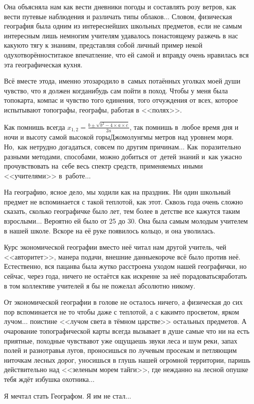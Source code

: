 Она объясняла нам как вести дневники погоды и составлять розу ветров, как вести путевые наблюдения и различать типы облаков$\ldots$ Словом, физическая география была одним из интереснейших школьных предметов, если не самым интересным\mdash 
лишь немногим учителям удавалось по\sdash настоящему разжечь в нас какую\sdash то тягу к знаниям, представляя собой личный пример некой одухотворённости\mdash такое впечатление, что ей самой и вправду очень нравилась вся эта географическая кухня.

Всё вместе это\mdash да, именно это\mdash зародило в~самых потаённых уголках моей души чувство, что я должен когда\sdash нибудь сам пойти в поход. Чтобы у меня была топокарта, компас и чувство того единения, того отчуждения от всех, которое испытывают топографы, географы, работая в <<полях>>.
 
Как помнишь всегда ${x_{1,2}= \frac{b\pm \sqrt{b^2-4\times a\times c}}{2a}}$, так помнишь в~любое время дня и ночи и высоту самой высокой горы\mdash Джомолунгмы метров над уровнем моря. Но,~как нетрудно догадаться, совсем по другим причинам$\ldots$ Как~поразительно разными методами, способами, можно добиться от~детей знаний и~как ужасно прочувствовать на~себе весь спектр средств, применяемых иными <<учителями>> в~работе$\ldots$ 

На географию, ясное дело, мы ходили как на праздник. Ни один школьный предмет не вспоминается с такой теплотой, как этот. Сквозь года очень сложно сказать, сколько географичке было лет, тем более в детстве все кажутся таким взрослыми$\ldots$ Вероятно ей было от 25 до 30. Она была самым молодым учителем в нашей школе. Вскоре на её руке появилось кольцо, и она уволилась. 

Курс экономической географии вместо неё читал нам другой учитель, чей <<авторитет>>, манера подачи, внешние данные\mdash короче всё было против неё. Естественно, вся пацанва была жутко расстроена уходом нашей географички, но сейчас, через года, ничего не остаётся как искренне за неё порадоваться\mdash работать в том коллективе учителей я бы не пожелал абсолютно никому. 

От экономической географии в голове не осталось ничего, а физическая до сих пор вспоминается не то чтобы даже с теплотой, а с каким\sdash то просветом, ярком лучом$\ldots$ поистине <<лучом света в тёмном царстве>> остальных предметов. А очарование топографической карты всегда вызывает в душе самые что ни на есть приятные, походные чувства\mdash вот уже ощущаешь звуки леса и шум реки, запах полей и разнотравья лугов, проносишься по лучевым просекам и петляющим ниточкам лесных дорог, уносишься в глушь нашей огромной территории, паришь действительно над <<зеленым морем тайги>>, где нежданно на лесной опушке тебя ждёт избушка охотника$\ldots$

Я мечтал стать Географом. Я им не стал$\ldots$
